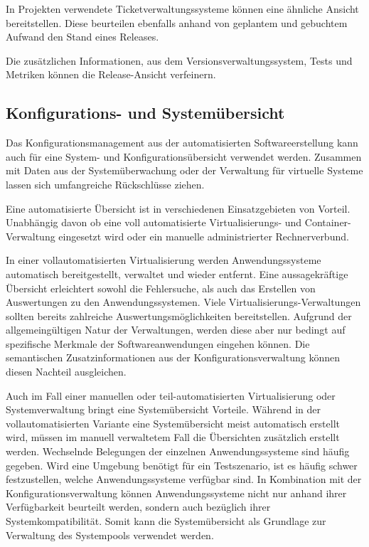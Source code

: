 In Projekten verwendete Ticketverwaltungssysteme können eine ähnliche Ansicht bereitstellen. Diese beurteilen ebenfalls anhand von geplantem und gebuchtem Aufwand den Stand eines Releases.

Die zusätzlichen Informationen, aus dem Versionsverwaltungssystem, Tests und Metriken können die Release-Ansicht verfeinern. 

\subsection{Konfigurations- und Systemübersicht}
\label{subsubsec:configuration-system-overview}

Das Konfigurationsmanagement aus der automatisierten Softwareerstellung kann auch für eine System- und Konfigurationsübersicht verwendet werden. Zusammen mit Daten aus der Systemüberwachung oder der Verwaltung für virtuelle Systeme lassen sich umfangreiche Rückschlüsse ziehen. 

Eine automatisierte Übersicht ist in verschiedenen Einsatzgebieten von Vorteil. Unabhängig davon ob eine voll automatisierte Virtualisierungs- und Container-Verwaltung eingesetzt wird oder ein manuelle administrierter Rechnerverbund.

In einer vollautomatisierten Virtualisierung werden Anwendungssysteme automatisch bereitgestellt, verwaltet und wieder entfernt. Eine aussagekräftige Übersicht erleichtert sowohl die Fehlersuche, als auch das Erstellen von Auswertungen zu den Anwendungssystemen. Viele Virtualisierungs\hyp{}Verwaltungen sollten bereits zahlreiche Auswertungsmöglichkeiten bereitstellen. Aufgrund der allgemeingültigen Natur der Verwaltungen, werden diese aber nur bedingt auf spezifische Merkmale der Softwareanwendungen eingehen können. Die semantischen Zusatzinformationen aus der Konfigurationsverwaltung können diesen Nachteil ausgleichen.

Auch im Fall einer manuellen oder teil-automatisierten Virtualisierung oder Systemverwaltung bringt eine Systemübersicht Vorteile. Während in der vollautomatisierten Variante eine Systemübersicht meist automatisch erstellt wird, müssen im manuell verwaltetem Fall die Übersichten zusätzlich erstellt werden. Wechselnde Belegungen der einzelnen Anwendungssysteme sind häufig gegeben. Wird eine Umgebung benötigt für ein Testszenario, ist es häufig schwer festzustellen, welche Anwendungssysteme verfügbar sind. In Kombination mit der Konfigurationsverwaltung können Anwendungssysteme nicht nur anhand ihrer Verfügbarkeit beurteilt werden, sondern auch bezüglich ihrer Systemkompatibilität. Somit kann die Systemübersicht als Grundlage zur Verwaltung des Systempools verwendet werden.

